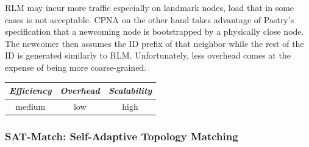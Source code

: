 RLM may incur more traffic especially on landmark nodes, load that in some cases
is not acceptable. CPNA on the other hand takes advantage of Pastry's
specification that a newcoming node is bootstrapped by a physically close
node.
The newcomer then assumes the ID prefix of that neighbor while the rest of the ID is 
generated similarly to RLM. Unfortunately, less overhead comes at the expense
of being more coarse-grained.

%
%
%

\begin{center}
\begin{tabular}{ccc}
\emph{Efficiency} & \emph{Overhead} & \emph{Scalability} \\
\hline
%
medium &
low &
high
\end{tabular}
\end{center}

\subsubsection{SAT-Match: Self-Adaptive Topology Matching}


